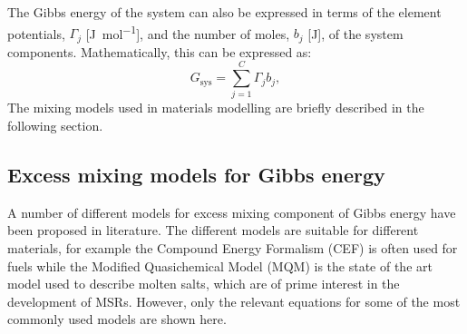 The Gibbs energy of  the system can also be expressed in terms of the element potentials, $\Gamma_j$ [\si{\joule \per \mole}], and the number of moles, $b_j$ [\si{\joule}], of the system components. Mathematically, this can be expressed as:
\begin{equation}\label{eq:elempot}
            G_\text{sys} = \sum_{j=1}^{C} \Gamma_j b_j,
    \end{equation}
The mixing models used in materials modelling are briefly described in the following section.

	\subsection{Excess mixing models for Gibbs energy}\label{sec:excess_models}
	A number of different models for excess mixing component of Gibbs energy have been proposed in literature. The different models are suitable for different materials, for example the Compound Energy Formalism (CEF) is often used for  fuels while the Modified Quasichemical Model (MQM) is the state of the art model used to describe molten salts, which are of prime interest in the development of MSRs. However, only the relevant equations for some of the most commonly used models are shown here.
